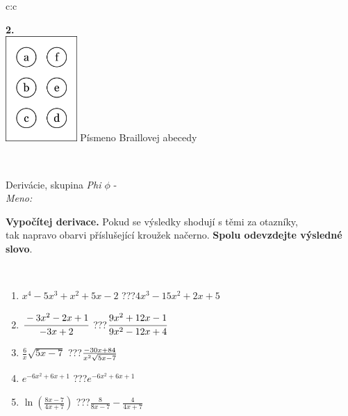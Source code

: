 \documentclass[10pt]{report}
\begin{document}
\begin{tabular}{c:c}
\begin{minipage}[c][104.5mm][t]{0.5\linewidth}
\begin{center}
\begin{minipage}{0.20\linewidth}
\begin{center}
{\Huge\bfseries 2.} \\[2mm]
\includegraphics[height=40mm]{../images/braille.png}
{\small Písmeno Braillovej abecedy}
\end{center}
\end{minipage}
\end{center}
\end{minipage}
\\ \hdashline
\begin{minipage}[c][104.5mm][t]{0.5\linewidth}
\begin{center}
\vspace{7mm}
{\huge Derivácie, skupina \textit{Phi $\phi$} -}\\[5mm]
\textit{Meno:}\phantom{xxxxxxxxxxxxxxxxxxxxxxxxxxxxxxxxxxxxxxxxxxxxxxxxxxxxxxxxxxxxxxxxx}\\[5mm]
\begin{minipage}{0.95\linewidth}
\begin{center}
\textbf{Vypočítej derivace.} Pokud se výsledky shodují s těmi za otazníky,\\tak napravo obarvi příslušející kroužek načerno. \textbf{Spolu odevzdejte výsledné slovo}.
\end{center}
\end{minipage}
\\[1mm]
\begin{minipage}{0.79\linewidth}
\begin{center}
\begin{varwidth}{\linewidth}
\begin{enumerate}
\normalsize
\item $x^4-5x^3+x^2+5x-2$\quad \dotfill\; ???\;\dotfill \quad $4x^3-15x^2+2x+5$
\item $\cfrac{-3x^2-2x+1}{-3x+2}$\quad \dotfill\; ???\;\dotfill \quad $\cfrac{9x^2+12x-1}{9x^2-12x+4}$
\item $\frac{6}{x}\sqrt{5x-7}$\quad \dotfill\; ???\;\dotfill \quad $\frac{-30x+84}{x^2 \sqrt{\smash[b]{5x-7}}}$
\item $e^{-6x^2+6x+1}$\quad \dotfill\; ???\;\dotfill \quad $e^{-6x^2+6x+1}$
\item $\ln{\left(\frac{8x-7}{4x+7}\right)}$\quad \dotfill\; ???\;\dotfill \quad $\frac{8}{8x-7}-\frac{4}{4x+7}$

\end{enumerate}
\end{varwidth}
\end{center}
\end{minipage}
\end{center}
\end{minipage}
\end{tabular}
\end{document}
